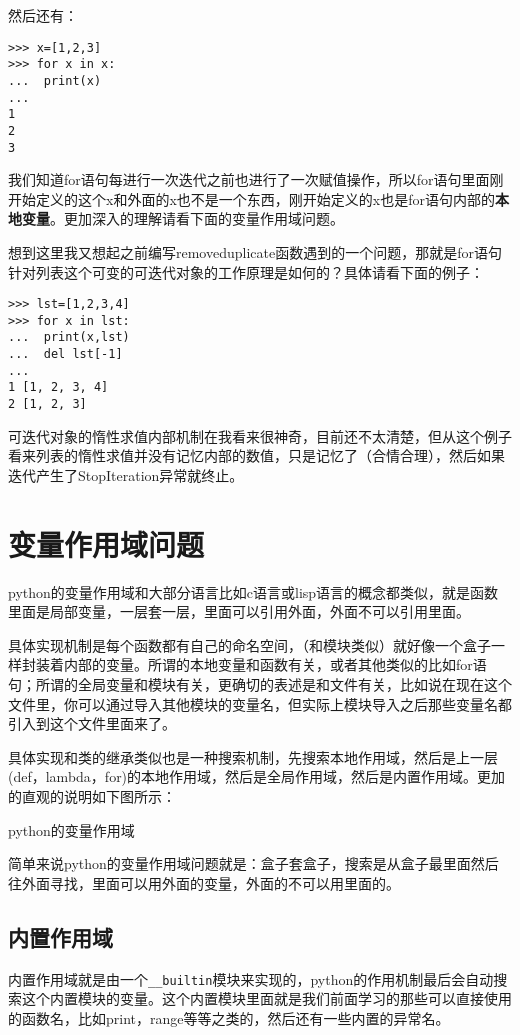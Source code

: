\documentclass[12pt,oneside]{book}
\begin{document}
\begin{common-format}
然后还有：
\begin{Verbatim}
>>> x=[1,2,3]
>>> for x in x:
...  print(x)
... 
1
2
3
\end{Verbatim}
我们知道for语句每进行一次迭代之前也进行了一次赋值操作，所以for语句里面刚开始定义的这个x和外面的x也不是一个东西，刚开始定义的x也是for语句内部的\textbf{本地变量}。更加深入的理解请看下面的变量作用域问题。

想到这里我又想起之前编写removeduplicate函数遇到的一个问题，那就是for语句针对列表这个可变的可迭代对象的工作原理是如何的？具体请看下面的例子：
\begin{Verbatim}
>>> lst=[1,2,3,4]
>>> for x in lst:
...  print(x,lst)
...  del lst[-1]
... 
1 [1, 2, 3, 4]
2 [1, 2, 3]
\end{Verbatim}
可迭代对象的惰性求值内部机制在我看来很神奇，目前还不太清楚，但从这个例子看来列表的惰性求值并没有记忆内部的数值，只是记忆了（合情合理），然后如果迭代产生了StopIteration异常就终止。



\section{变量作用域问题}
python的变量作用域和大部分语言比如c语言或lisp语言的概念都类似，就是函数里面是局部变量，一层套一层，里面可以引用外面，外面不可以引用里面。

具体实现机制是每个函数都有自己的命名空间，（和模块类似）就好像一个盒子一样封装着内部的变量。所谓的本地变量和函数有关，或者其他类似的比如for语句；所谓的全局变量和模块有关，更确切的表述是和文件有关，比如说在现在这个文件里，你可以通过导入其他模块的变量名，但实际上模块导入之后那些变量名都引入到这个文件里面来了。

具体实现和类的继承类似也是一种搜索机制，先搜索本地作用域，然后是上一层(def，lambda，for)的本地作用域，然后是全局作用域，然后是内置作用域。更加的直观的说明如下图所示：
\begin{fig}{python的变量作用域}
\caption{python的变量作用域}
\label{fig:python的变量作用域}
\end{fig}

简单来说python的变量作用域问题就是：盒子套盒子，搜索是从盒子最里面然后往外面寻找，里面可以用外面的变量，外面的不可以用里面的。


\subsection{内置作用域}
内置作用域就是由一个\verb+__builtin+模块来实现的，python的作用机制最后会自动搜索这个内置模块的变量。这个内置模块里面就是我们前面学习的那些可以直接使用的函数名，比如print，range等等之类的，然后还有一些内置的异常名。


\end{common-format}
\end{document}
